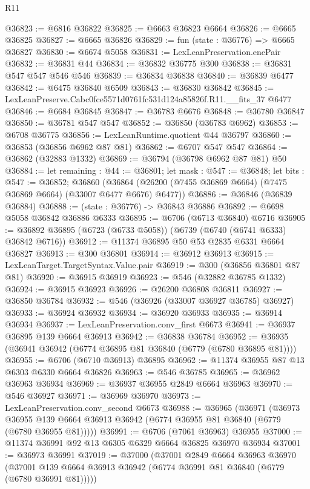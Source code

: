\begin{lexlean}{R11}
\begin{coremodule}
@36823 := @6816 @36822
@36825 := @6663 @36823 @6664
@36826 := @6665 @36825
@36827 := @6665 @36826
@36829 := fun (state : @36776) => @6665 @36827
@36830 := @6674 @5058
@36831 := LexLeanPreservation.encPair
@36832 := @36831 @44
@36834 := @36832 @36775 @300
@36838 := @36831 @547 @547 @546 @546
@36839 := @36834 @36838
@36840 := @36839 @6477
@36842 := @6475 @36840 @6509
@36843 := @36830 @36842
@36845 := LexLeanPreserve.Cabc0fce5571d0761fc531d124a85826f.R11.__fits_37 @6477
@36846 := @6684 @36845
@36847 := @36783 @6676
@36848 := @36780 @36847
@36850 := @36781 @547 @547
@36852 := @36850 (@36783 @6962)
@36853 := @6708 @36775
@36856 := LexLeanRuntime.quotient @44 @36797
@36860 := @36853 (@36856 @6962 @87 @81)
@36862 := @6707 @547 @547
@36864 := @36862 (@32883 @1332)
@36869 := @36794 (@36798 @6962 @87 @81) @50
@36884 := let remaining : @44 := @36801;
  let mask : @547 := @36848;
  let bits : @547 := @36852;
  @36860 (@36864 (@26200 (@7455 @36869 @6664) (@7475 @36869 @6664) (@33007 @6477 @6676) @6477))
@36886 := @36846 (@36839 @36884)
@36888 := (state : @36776) -> @36843 @36886
@36892 := @6698 @5058 @36842 @36886 @6333
@36895 := @6706 (@6713 @36840) @6716
@36905 := @36892 @36895 (@6723 (@6733 @5058)) (@6739 (@6740 (@6741 @6333) @36842 @6716))
@36912 := @11374 @36895 @50 @53 @2835 @6331 @6664 @36827
@36913 := @300 @36801
@36914 := @36912 @36913
@36915 := LexLeanTarget.TargetSyntax.Value.pair
@36919 := @300 (@36856 @36801 @87 @81)
@36920 := @36915 @36919
@36923 := @546 (@32882 @36785 @1332)
@36924 := @36915 @36923
@36926 := @26200 @36808 @36811
@36927 := @36850 @36784
@36932 := @546 (@36926 (@33007 @36927 @36785) @36927)
@36933 := @36924 @36932
@36934 := @36920 @36933
@36935 := @36914 @36934
@36937 := LexLeanPreservation.conv_first @6673
@36941 := @36937 @36895 @139 @6664 @36913
@36942 := @36838 @36784
@36952 := @36935 (@36941 @36942 (@6774 @36895 @81 @36840 (@6779 (@6780 @36895 @81))))
@36955 := @6706 (@6710 @36913) @36895
@36962 := @11374 @36955 @87 @13 @6303 @6330 @6664 @36826
@36963 := @546 @36785
@36965 := @36962 @36963 @36934
@36969 := @36937 @36955 @2849 @6664 @36963
@36970 := @546 @36927
@36971 := @36969 @36970
@36973 := LexLeanPreservation.conv_second @6673
@36988 := @36965
    (@36971
      (@36973 @36955 @139 @6664 @36913 @36942 (@6774 @36955 @81 @36840 (@6779 (@6780 @36955 @81)))))
@36991 := @6706 (@7061 @36963) @36955
@37000 := @11374 @36991 @92 @13 @6305 @6329 @6664 @36825 @36970 @36934
@37001 := @36973 @36991
@37019 := @37000
    (@37001
      @2849
      @6664
      @36963
      @36970
      (@37001 @139 @6664 @36913 @36942 (@6774 @36991 @81 @36840 (@6779 (@6780 @36991 @81)))))

\end{coremodule}
\end{lexlean}
